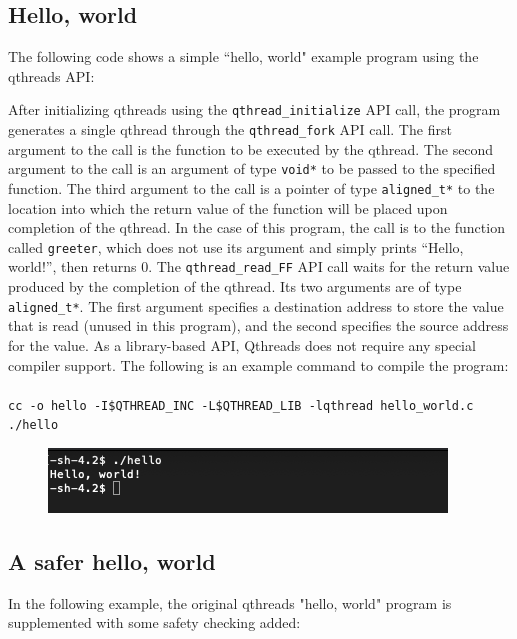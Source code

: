 \documentclass[12pt,fullpage]{article}
\begin{document}
\subsection{Hello, world}

The following code shows a simple ``hello, world" example program using the qthreads API:


After initializing qthreads using the {\tt qthread\_initialize} API call, the program generates a single qthread through the {\tt qthread\_fork} API call.  The first argument to the call is the function to be executed by the qthread.  The second argument to the call is an argument of type {\tt void*} to be passed to the specified function.  The third argument to the call is a pointer of type {\tt aligned\_t*} to the location into which the return value of the function will be placed upon completion of the qthread.  In the case of this program, the call is to the function called {\tt greeter}, which does not use its argument and simply prints ``Hello, world!'', then returns 0.  The {\tt qthread\_read\_FF} API call waits for the return value produced by the completion of the qthread.  Its two arguments are of type {\tt aligned\_t*}.  The first argument specifies a destination address to store the value that is read (unused in this program), and the second specifies the source address for the value.
As a library-based API, Qthreads does not require any special compiler support.  The following is an example command to compile the program:
\\ \\
{\footnotesize{\tt cc -o hello -I\$QTHREAD\_INC -L\$QTHREAD\_LIB -lqthread hello\_world.c}}
\\
{\footnotesize{\tt ./hello}}
\begin{figure}[h]
\includegraphics{hello_world.png}
\end{figure}

\subsection{A safer hello, world}

In the following example, the original qthreads "hello, world" program is supplemented with some safety checking added:
\\

\end{document}
